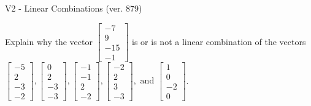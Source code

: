 \begin{exercise}
  \begin{exerciseTitle}V2 - Linear Combinations (ver. 879)\end{exerciseTitle}
  \begin{exerciseStatement}
    Explain why the vector \(\left[\begin{array}{c}
-7 \\
9 \\
-15 \\
-1
\end{array}\right]\)  is or is not a linear 
	combination of the vectors \(\left[\begin{array}{c}
-5 \\
2 \\
-3 \\
-2
\end{array}\right] , \left[\begin{array}{c}
0 \\
2 \\
-3 \\
-3
\end{array}\right] , \left[\begin{array}{c}
-1 \\
-1 \\
2 \\
-2
\end{array}\right] , \left[\begin{array}{c}
-2 \\
2 \\
3 \\
-3
\end{array}\right] , \text{ and } \left[\begin{array}{c}
1 \\
0 \\
-2 \\
0
\end{array}\right]\).
	



\end{exerciseStatement}
\end{exercise}
